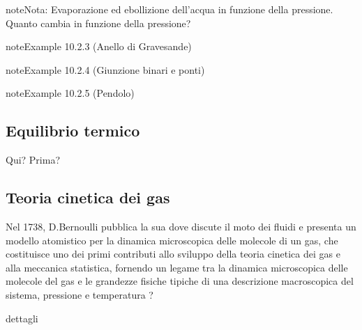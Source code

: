 \documentclass[letterpaper,10pt,italian]{jupyterBook}
\begin{document}
\begin{sphinxadmonition}{note}{Nota:}
\sphinxAtStartPar
Evaporazione ed ebollizione dell’acqua in funzione della pressione. Quanto cambia in funzione della pressione?
\end{sphinxadmonition}


\label{ch/thermodynamics/foundation-experiments:example-2}
\begin{sphinxadmonition}{note}{Example 10.2.3 (Anello di Gravesande)}


\end{sphinxadmonition}
\label{ch/thermodynamics/foundation-experiments:example-3}
\begin{sphinxadmonition}{note}{Example 10.2.4 (Giunzione binari e ponti)}


\end{sphinxadmonition}
\label{ch/thermodynamics/foundation-experiments:example-4}
\begin{sphinxadmonition}{note}{Example 10.2.5 (Pendolo)}


\end{sphinxadmonition}




\subsection{Equilibrio termico}
\label{\detokenize{ch/thermodynamics/foundation-experiments:equilibrio-termico}}
\sphinxAtStartPar
  Qui? Prima? 


\subsection{Teoria cinetica dei gas}
\label{\detokenize{ch/thermodynamics/foundation-experiments:teoria-cinetica-dei-gas}}
\sphinxAtStartPar
Nel 1738, D.Bernoulli pubblica la sua  dove discute il moto dei fluidi e presenta un modello atomistico per la dinamica microscopica delle molecole di un gas, che costituisce uno dei primi contributi allo sviluppo della teoria cinetica dei gas e alla meccanica statistica, fornendo un legame tra la dinamica microscopica delle molecole del gas e le grandezze fisiche tipiche di una descrizione macroscopica del sistema, pressione e  temperatura  ? 

\sphinxAtStartPar
 dettagli 
\end{document}
